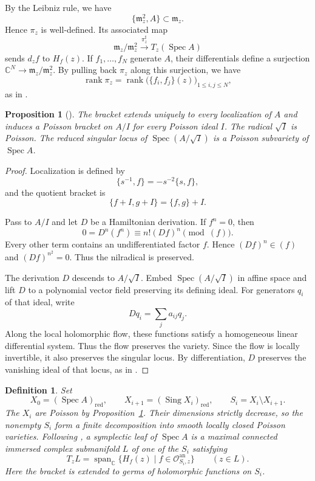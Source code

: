 \documentclass[12pt]{article}
\theoremstyle{paperplain}
\newtheorem{proposition}[theorem]{Proposition}
\theoremstyle{paperdefinition}
\newtheorem{definition}[theorem]{Definition}
\DeclareMathOperator{\Spec}{Spec}
\newcommand{\C}{\mathbb C}
\begin{document}
By the Leibniz rule, we have
$$
    \{\mathfrak m_z^2,A\}\subset\mathfrak m_z.
$$
Hence $\pi_z$ is well-defined. Its associated map
$$
    \mathfrak m_z/\mathfrak m_z^2\xrightarrow{\pi_z^\sharp}T_z(\Spec A)
$$
sends $d_zf$ to $H_f(z)$. If $f_1,\ldots,f_N$ generate $A$, their differentials define a surjection $\C^N\to\mathfrak m_z/\mathfrak m_z^2$. By pulling back $\pi_z$ along this surjection, we have
$$
    \operatorname{rank}\pi_z
    =\operatorname{rank}\bigl(\{f_i,f_j\}(z)\bigr)_{1\le i,j\le N},
$$
as in \cite[Section~3.1]{BrownGordon}.

\begin{proposition}[{\cite[Sections~2.4 and~3.5]{BrownGordon}}]\label{prop:poisson-subvarieties}
    The bracket extends uniquely to every localization of $A$ and induces a Poisson bracket on $A/I$ for every Poisson ideal $I$. The radical $\sqrt I$ is Poisson. The reduced singular locus of $\Spec(A/\sqrt I)$ is a Poisson subvariety of $\Spec A$.
\end{proposition}

\begin{proof}
    Localization is defined by
    $$
        \{s^{-1},f\}=-s^{-2}\{s,f\},
    $$
    and the quotient bracket is
    $$
        \{f+I,g+I\}=\{f,g\}+I.
    $$

    Pass to $A/I$ and let $D$ be a Hamiltonian derivation. If $f^n=0$, then
    $$
        0=D^n(f^n)\equiv n!(Df)^n\pmod{(f)}.
    $$
    Every other term contains an undifferentiated factor $f$. Hence $(Df)^n\in(f)$ and $(Df)^{n^2}=0$. Thus the nilradical is preserved.

    The derivation $D$ descends to $A/\sqrt I$. Embed $\Spec(A/\sqrt I)$ in affine space and lift $D$ to a polynomial vector field preserving its defining ideal. For generators $q_i$ of that ideal, write
    $$
        Dq_i=\sum_j a_{ij}q_j.
    $$
    Along the local holomorphic flow, these functions satisfy a homogeneous linear differential system. Thus the flow preserves the variety. Since the flow is locally invertible, it also preserves the singular locus. By differentiation, $D$ preserves the vanishing ideal of that locus, as in \cite[Section~3.5]{BrownGordon}.
\end{proof}

\begin{definition}\label{def:symplectic-leaf}
    Set
    $$
        X_0=(\Spec A)_{\mathrm{red}},\qquad
        X_{i+1}=(\operatorname{Sing}X_i)_{\mathrm{red}},\qquad
        S_i=X_i\setminus X_{i+1}.
    $$
    The $X_i$ are Poisson by Proposition~\ref{prop:poisson-subvarieties}. Their dimensions strictly decrease, so the nonempty $S_i$ form a finite decomposition into smooth locally closed Poisson varieties. Following \cite[Section~3.5]{BrownGordon}, a \emph{symplectic leaf} of $\Spec A$ is a maximal connected immersed complex submanifold $L$ of one of the $S_i$ satisfying
    $$
        T_zL=\operatorname{span}_{\C}
        \{H_f(z)\mid f\in\mathcal O^{\mathrm{an}}_{S_i,z}\}
        \qquad(z\in L).
    $$
    Here the bracket is extended to germs of holomorphic functions on $S_i$.
\end{definition}
\end{document}
